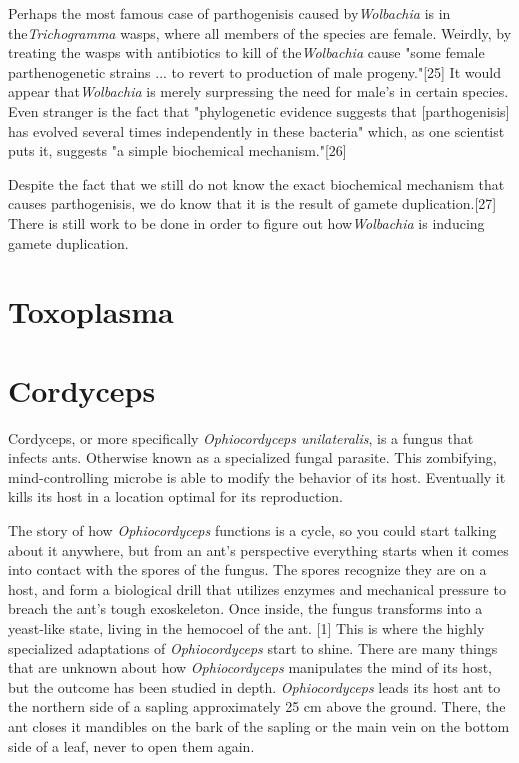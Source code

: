 \documentclass[twocolumn]{article}
\begin{document}
Perhaps the most famous case of parthogenisis caused by\textit{Wolbachia} is in the\textit{Trichogramma} wasps, where all members of the species are female. Weirdly, by treating the wasps with antibiotics to kill of the\textit{Wolbachia} cause "some female parthenogenetic strains ... to revert to production of male progeny."[25] It would appear that\textit{Wolbachia} is merely surpressing the need for male's in certain species. Even stranger is the fact that "phylogenetic evidence suggests that [parthogenisis] has evolved several times independently in these bacteria" which, as one scientist puts it, suggests "a simple biochemical mechanism."[26]  

Despite the fact that we still do not know the exact biochemical mechanism that causes parthogenisis, we do know that it is the result of gamete duplication.[27] There is still work to be done in order to figure out how\textit{Wolbachia} is inducing gamete duplication.

\section*{Toxoplasma}

\section*{Cordyceps}
Cordyceps, or more specifically \textit{Ophiocordyceps unilateralis}, is a fungus that infects ants. Otherwise known as a specialized fungal parasite. This zombifying, mind-controlling microbe is able to modify the behavior of its host. Eventually it kills its host in a location optimal for its reproduction. 

The story of how \textit{Ophiocordyceps} functions is a cycle, so you could start talking about it anywhere, but from an ant's perspective everything starts when it comes into contact with the spores of the fungus. The spores recognize they are on a host, and form a biological drill that utilizes enzymes and mechanical pressure to breach the ant's tough exoskeleton. Once inside, the fungus transforms into a yeast-like state, living in the hemocoel of the ant. [1] This is where the highly specialized adaptations of \textit{Ophiocordyceps} start to shine. There are many things that are unknown about how \textit{Ophiocordyceps} manipulates the mind of its host, but the outcome has been studied in depth. \textit{Ophiocordyceps} leads its host ant to the northern side of a sapling approximately 25 cm above the ground. There, the ant closes it mandibles on the bark of the sapling or the main vein on the bottom side of a leaf, never to open them again. 
\end{document}
